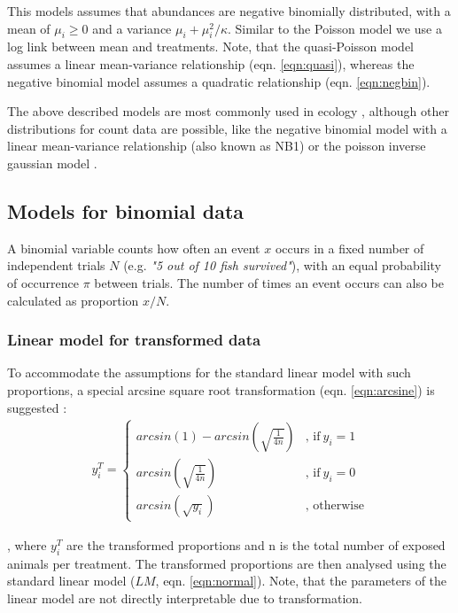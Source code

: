 \documentclass[twocolumn, natbib]{svjour3}
\begin{document}
This models assumes that abundances are negative binomially distributed, with a mean of $\mu_i \ge 0$ and a variance $\mu_i + \mu_i^2 / \kappa$.
Similar to the Poisson model we use a log link between mean and treatments.
Note, that the quasi-Poisson model assumes a linear mean-variance relationship (eqn. \ref{eqn:quasi}), whereas the negative binomial model assumes a quadratic relationship (eqn. \ref{eqn:negbin}).

The above described models are most commonly used in ecology \citep{ver_hoef_quasi-poisson_2007}, although other distributions for count data are possible, like the negative binomial model with a linear mean-variance relationship (also known as NB1) or the poisson inverse gaussian model \citep{hilbe_modeling_2014}.


\subsection{Models for binomial data}
\label{ssec:bin}
A binomial variable counts how often an event $x$ occurs in a fixed number of independent trials $N$ (e.g. \emph{"5 out of 10 fish survived"}), with an equal probability of occurrence $\pi$ between trials.
The number of times an event occurs can also be calculated as proportion $x / N$.

\subsubsection{Linear model for transformed data}
To accommodate the assumptions for the standard linear model with such proportions, a special arcsine square root transformation (eqn. \ref{eqn:arcsine}) is suggested \citep{epa_methods_2002,newman_quantitative_2012}:
\begin{align}
  y_i^T = 
  \begin{cases}  
    arcsin(1) - arcsin(\sqrt{\frac{1}{4n}}) & \text{, if}\ y_i = 1 \\
    arcsin(\sqrt{\frac{1}{4n}}) & \text{, if}\ y_i = 0  \\
    arcsin(\sqrt{y_i}) & \text{, otherwise}
  \end{cases} \label{eqn:arcsine}
\end{align}

, where $y_i^T$ are the transformed proportions and n is the total number of exposed animals per treatment.
The transformed proportions are then analysed using the standard linear model ($LM$, eqn. \ref{eqn:normal}).
Note, that the parameters of the linear model are not directly interpretable due to transformation.
\end{document}
